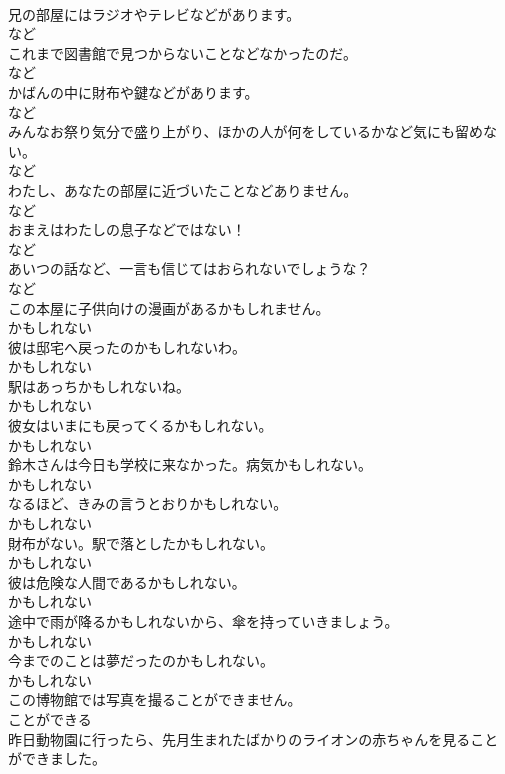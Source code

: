 \documentclass[8pt]{extreport}
\begin{document}
\begin{CJK}{UTF8}{min}
\\	兄の部屋にはラジオやテレビなどがあります。	
\\	など
\\	これまで図書館で見つからないことなどなかったのだ。	
\\	など
\\	かばんの中に財布や鍵などがあります。	
\\	など
\\	みんなお祭り気分で盛り上がり、ほかの人が何をしているかなど気にも留めない。	
\\	など
\\	わたし、あなたの部屋に近づいたことなどありません。	
\\	など
\\	おまえはわたしの息子などではない！	
\\	など
\\	あいつの話など、一言も信じてはおられないでしょうな？	
\\	など
\\	この本屋に子供向けの漫画があるかもしれません。	
\\	かもしれない
\\	彼は邸宅へ戻ったのかもしれないわ。	
\\	かもしれない
\\	駅はあっちかもしれないね。	
\\	かもしれない
\\	彼女はいまにも戻ってくるかもしれない。	
\\	かもしれない
\\	鈴木さんは今日も学校に来なかった。病気かもしれない。	
\\	かもしれない
\\	なるほど、きみの言うとおりかもしれない。	
\\	かもしれない
\\	財布がない。駅で落としたかもしれない。	
\\	かもしれない
\\	彼は危険な人間であるかもしれない。	
\\	かもしれない
\\	途中で雨が降るかもしれないから、傘を持っていきましょう。	
\\	かもしれない
\\	今までのことは夢だったのかもしれない。	
\\	かもしれない
\\	この博物館では写真を撮ることができません。	
\\	ことができる
\\	昨日動物園に行ったら、先月生まれたばかりのライオンの赤ちゃんを見ることができました。	

\end{CJK}
\end{document}
